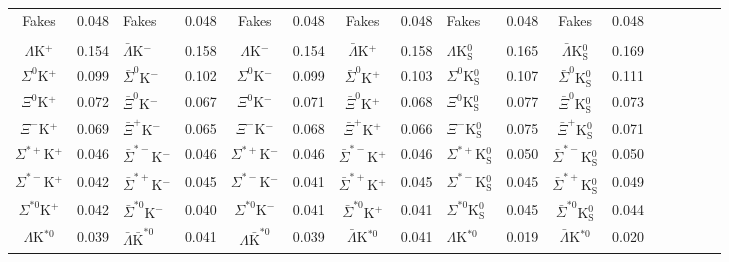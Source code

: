 \begin{landscape}
\begin{table}[htbp]
{\begin{tabular}{|c|cV{5.0}c|cV{5.0}c|cV{5.0}c|cV{5.0}c|cV{5.0}c|c|}
  Fakes & 0.048 & Fakes & 0.048 & Fakes & 0.048 & Fakes & 0.048 & Fakes & 0.048 & Fakes & 0.048 \\
  
   \\
  $\Lambda$K$^{+}$ & 0.154 & $\bar{\Lambda}$K$^{-}$ & 0.158 & $\Lambda$K$^{-}$ & 0.154 & $\bar{\Lambda}$K$^{+}$ & 0.158 & $\Lambda$K$^{0}_{\mathrm{S}}$ & 0.165 & $\bar{\Lambda}$K$^{0}_{\mathrm{S}}$ & 0.169 \\
  
  $\Sigma^{0}$K$^{+}$ & 0.099 & $\bar{\Sigma}^{0}$K$^{-}$ & 0.102 & $\Sigma^{0}$K$^{-}$ & 0.099 & $\bar{\Sigma}^{0}$K$^{+}$ & 0.103 & $\Sigma^{0}$K$^{0}_{\mathrm{S}}$ & 0.107 & $\bar{\Sigma}^{0}$K$^{0}_{\mathrm{S}}$ & 0.111 \\
  
  $\Xi^{0}$K$^{+}$ & 0.072 & $\bar{\Xi}^{0}$K$^{-}$ & 0.067 & $\Xi^{0}$K$^{-}$ & 0.071 & $\bar{\Xi}^{0}$K$^{+}$ & 0.068 & $\Xi^{0}$K$^{0}_{\mathrm{S}}$ & 0.077 & $\bar{\Xi}^{0}$K$^{0}_{\mathrm{S}}$ & 0.073 \\
  
  $\Xi^{-}$K$^{+}$ & 0.069 & $\bar{\Xi}^{+}$K$^{-}$ & 0.065 & $\Xi^{-}$K$^{-}$ & 0.068 & $\bar{\Xi}^{+}$K$^{+}$ & 0.066 & $\Xi^{-}$K$^{0}_{\mathrm{S}}$ & 0.075 & $\bar{\Xi}^{+}$K$^{0}_{\mathrm{S}}$ & 0.071 \\
  
  $\Sigma^{*+}$K$^{+}$ & 0.046 & $\bar{\Sigma}^{*-}$K$^{-}$ & 0.046 & $\Sigma^{*+}$K$^{-}$ & 0.046 & $\bar{\Sigma}^{*-}$K$^{+}$ & 0.046 & $\Sigma^{*+}$K$^{0}_{\mathrm{S}}$ & 0.050 & $\bar{\Sigma}^{*-}$K$^{0}_{\mathrm{S}}$ & 0.050 \\
  
  $\Sigma^{*-}$K$^{+}$ & 0.042 & $\bar{\Sigma}^{*+}$K$^{-}$ & 0.045 & $\Sigma^{*-}$K$^{-}$ & 0.041 & $\bar{\Sigma}^{*+}$K$^{+}$ & 0.045 & $\Sigma^{*-}$K$^{0}_{\mathrm{S}}$ & 0.045 & $\bar{\Sigma}^{*+}$K$^{0}_{\mathrm{S}}$ & 0.049 \\
  
  $\Sigma^{*0}$K$^{+}$ & 0.042 & $\bar{\Sigma}^{*0}$K$^{-}$ & 0.040 & $\Sigma^{*0}$K$^{-}$ & 0.041 & $\bar{\Sigma}^{*0}$K$^{+}$ & 0.041 & $\Sigma^{*0}$K$^{0}_{\mathrm{S}}$ & 0.045 & $\bar{\Sigma}^{*0}$K$^{0}_{\mathrm{S}}$ & 0.044 \\
  
  $\Lambda$K$^{*0}$ & 0.039 & $\bar{\Lambda}\bar{\mathrm{K}}^{*0}$ & 0.041 & $\Lambda\bar{\mathrm{K}}^{*0}$ & 0.039 & $\bar{\Lambda}$K$^{*0}$ & 0.041 & $\Lambda$K$^{*0}$ & 0.019 & $\bar{\Lambda}$K$^{*0}$ & 0.020 \\
  

\end{tabular}}
\end{table}
\end{landscape}
